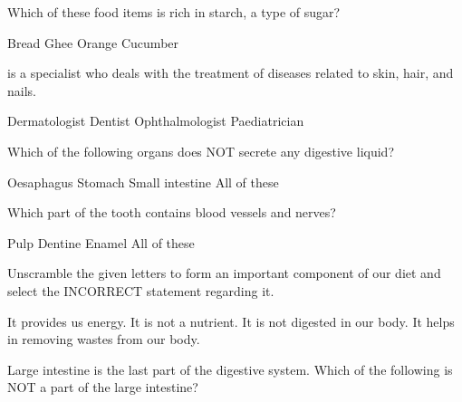 \begin{questions}
    \question Which of these food items is rich in starch, a type of sugar?

    \begin{randomizeoneparchoices}
        \CorrectChoice Bread
        \choice Ghee
        \choice Orange
        \choice Cucumber
    \end{randomizeoneparchoices}

    \question \fillin is a specialist who deals with the treatment of diseases related to skin, hair, and nails.

    \begin{randomizeoneparchoices}
        \CorrectChoice Dermatologist
        \choice Dentist
        \choice Ophthalmologist
        \choice Paediatrician
    \end{randomizeoneparchoices}

    \question Which of the following organs does NOT secrete any digestive liquid?

    \begin{randomizeoneparchoices}
        \CorrectChoice Oesaphagus
        \choice Stomach
        \choice Small intestine
        \choice All of these
    \end{randomizeoneparchoices}

    \question Which part of the tooth contains blood vessels and nerves?

    \begin{randomizeoneparchoices}
        \CorrectChoice Pulp
        \choice Dentine
        \choice Enamel
        \choice All of these
    \end{randomizeoneparchoices}

    \question Unscramble the given letters to form an important component of our diet and select the INCORRECT statement regarding it.

    \begin{center}
    \end{center}

    \begin{randomizechoices}
        \CorrectChoice It provides us energy.
        \choice It is not a nutrient.
        \choice It is not digested in our body.
        \choice It helps in removing wastes from our body.
    \end{randomizechoices}

    \question Large intestine is the last part of the digestive system. Which of the following is NOT a part of the large intestine?


\end{questions}
